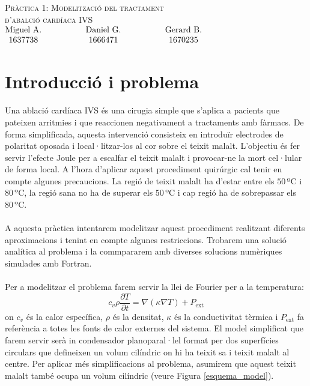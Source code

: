 \documentclass{article}
\begin{document}
\thispagestyle{empty}
\begin{center}
    {\LARGE \textsc{Pràctica 1: Modelització del tractament}}\\ 
    \vspace{0.2cm}
    {\LARGE \textsc{d'abalció cardíaca IVS}}\\ 
    \vspace{0.2cm}
    $\begin{matrix} 
    \text{Miguel A.} \hspace{1.5cm} & \text{Daniel G.} & \hspace{1.5cm} \text{Gerard B.}\\1637738 \hspace{1.5cm} & 1666471 & \hspace{1.5cm} 1670235
    \end{matrix}$

    
\end{center}
\section{Introducció i problema}
Una ablació cardíaca IVS és una cirugia simple que s'aplica a pacients que pateixen arritmies i que reaccionen negativament a tractaments amb fàrmacs. De forma simplificada, aquesta intervenció consisteix en introduïr electrodes de polaritat oposada i local·litzar-los al cor sobre el teixit malalt. L'objectiu és fer servir l'efecte Joule per a escalfar el teixit malalt i provocar-ne la mort cel·lular de forma local. A l'hora d'aplicar aquest procediment quirúrgic cal tenir en compte algunes precaucions. La regió de teixit malalt ha d'estar entre els \(50\,\text{ºC}\) i \(80\,\text{ºC}\), la regió sana no ha de superar els \(50\,\text{ºC}\) i cap regió ha de sobrepassar els \(80\,\text{ºC}\).\\\\
A aquesta pràctica intentarem modelitzar aquest procediment realitzant diferents aproximacions i tenint en compte algunes restriccions. Trobarem una solució analítica al problema i la commpararem amb diverses solucions numèriques simulades amb Fortran.\\\\
Per a modelitzar el problema farem servir la llei de Fourier per a la temperatura:
\begin{equation*}
    c_{v}\rho \frac{\partial T}{\partial t} = \nabla (\kappa \nabla T) + P_{\text{ext}}
\end{equation*}
on $c_{v}$ és la calor específica, $\rho$ és la densitat, $\kappa$ és la conductivitat tèrmica i $P_{\text{ext}}$ fa referència a totes les fonts de calor externes del sistema. El model simplificat que farem servir serà in condensador planoparal·lel format per dos superfícies circulars que defineixen un volum cilíndric on hi ha teixit sa i teixit malalt al centre. Per aplicar més simplificacions al problema, asumirem que aquest teixit malalt també ocupa un volum cilíndric (veure Figura \ref{esquema_model}). 
\end{document}
